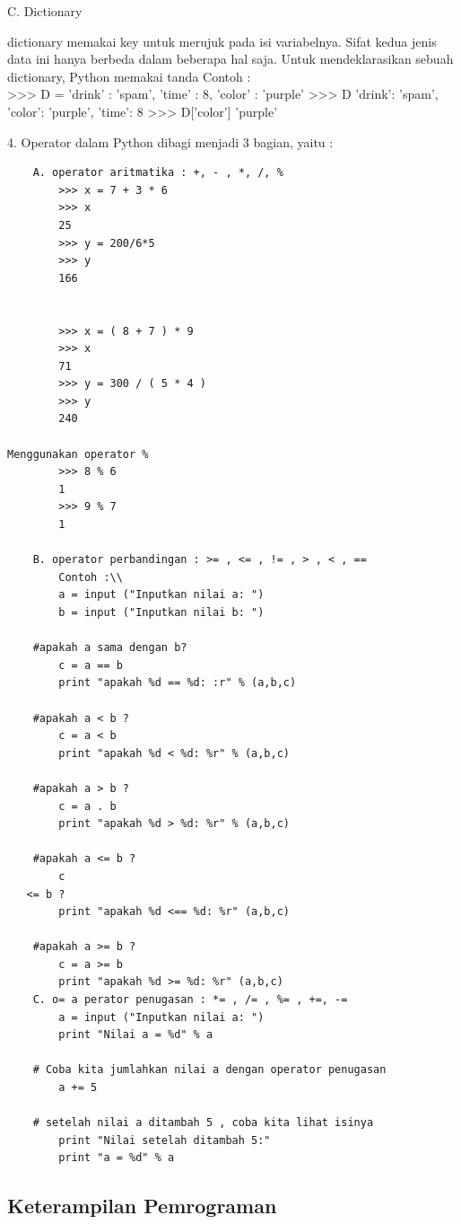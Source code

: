 C. Dictionary

    dictionary memakai key untuk merujuk pada isi variabelnya. Sifat kedua jenis data ini hanya berbeda dalam beberapa hal saja. Untuk mendeklarasikan sebuah dictionary, Python memakai tanda { }
    Contoh :\\
    >>> D = { 'drink' : 'spam', 'time' : 8, 'color' : 'purple'}
    >>> D {'drink': 'spam', 'color': 'purple', 'time': 8}
    >>> D['color'] 'purple'
    
4. Operator dalam Python dibagi menjadi 3 bagian, yaitu :
\begin{lstlisting}
    A. operator aritmatika : +, - , *, /, %
        >>> x = 7 + 3 * 6
        >>> x
        25
        >>> y = 200/6*5
        >>> y
        166
        
        
        >>> x = ( 8 + 7 ) * 9
        >>> x
        71
        >>> y = 300 / ( 5 * 4 )
        >>> y
        240
        
Menggunakan operator %
        >>> 8 % 6
        1
        >>> 9 % 7
        1
        
    B. operator perbandingan : >= , <= , != , > , < , ==
        Contoh :\\
        a = input ("Inputkan nilai a: ")
        b = input ("Inputkan nilai b: ")
    
    #apakah a sama dengan b?
        c = a == b
        print "apakah %d == %d: :r" % (a,b,c)
        
    #apakah a < b ?
        c = a < b
        print "apakah %d < %d: %r" % (a,b,c)
        
    #apakah a > b ?
        c = a . b
        print "apakah %d > %d: %r" % (a,b,c)
        
    #apakah a <= b ?
        c 
   <= b ?
        print "apakah %d <== %d: %r" (a,b,c)
        
    #apakah a >= b ?
        c = a >= b
        print "apakah %d >= %d: %r" (a,b,c)     
    C. o= a perator penugasan : *= , /= , %= , +=, -=
        a = input ("Inputkan nilai a: ")
        print "Nilai a = %d" % a
        
    # Coba kita jumlahkan nilai a dengan operator penugasan
        a += 5
        
    # setelah nilai a ditambah 5 , coba kita lihat isinya
        print "Nilai setelah ditambah 5:"
        print "a = %d" % a
\end{lstlisting}
\subsection{Keterampilan Pemrograman}

